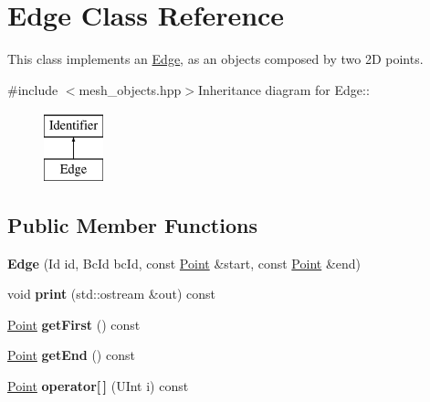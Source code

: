 \hypertarget{classEdge}{
\section{Edge Class Reference}
\label{classEdge}
}


This class implements an \hyperlink{classEdge}{Edge}, as an objects composed by two 2D points.  


{\ttfamily \#include $<$mesh\_\-objects.hpp$>$}Inheritance diagram for Edge::\begin{figure}[H]
\begin{center}
\leavevmode
\includegraphics[height=2cm]{classEdge}
\end{center}
\end{figure}
\subsection*{Public Member Functions}
\begin{DoxyCompactItemize}
\item 
\hypertarget{classEdge_ab4cc26a850f41458630352cdba59d6b0}{
{\bfseries Edge} (Id id, BcId bcId, const \hyperlink{classPoint}{Point} \&start, const \hyperlink{classPoint}{Point} \&end)}
\label{classEdge_ab4cc26a850f41458630352cdba59d6b0}

\item 
\hypertarget{classEdge_af8d0a024ae2b1d02144c744140fe0285}{
void {\bfseries print} (std::ostream \&out) const }
\label{classEdge_af8d0a024ae2b1d02144c744140fe0285}

\item 
\hypertarget{classEdge_a2e750308a1b56fb5b17ca13136730ae7}{
\hyperlink{classPoint}{Point} {\bfseries getFirst} () const }
\label{classEdge_a2e750308a1b56fb5b17ca13136730ae7}

\item 
\hypertarget{classEdge_ae06457bc71fac7a58b35db0ea62a85ca}{
\hyperlink{classPoint}{Point} {\bfseries getEnd} () const }
\label{classEdge_ae06457bc71fac7a58b35db0ea62a85ca}

\item 
\hypertarget{classEdge_a1c6c3568ea4329c91674d6466311db9d}{
\hyperlink{classPoint}{Point} {\bfseries operator\mbox{[}$\,$\mbox{]}} (UInt i) const }
\label{classEdge_a1c6c3568ea4329c91674d6466311db9d}

\end{DoxyCompactItemize}
